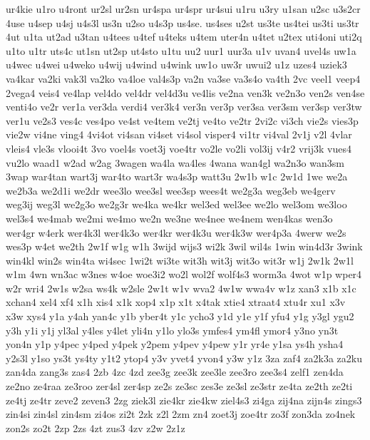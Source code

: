 {ur4kie
u1ro
u4ront
ur2sl
ur2sn
ur4spa
ur4spr
ur4sui
u1ru
u3ry
u1san
u2sc
u3s2cr
4use
u4sep
u4sj
u4s3l
us3n
u2so
u4s3p
us4se.
us4ses
u2st
us3te
us4tei
us3ti
us3tr
4ut
u1ta
ut2ad
u3tan
u4tees
u4tef
u4teks
u4tem
uter4n
u4tet
u2tex
uti4oni
uti2q
u1to
u1tr
uts4c
ut1sn
ut2sp
ut4sto
u1tu
uu2
uur1
uur3a
u1v
uvan4
uvel4s
uw1a
u4wec
u4wei
u4weko
u4wij
u4wind
u4wink
uw1o
uw3r
uwui2
u1z
uzes4
uziek3
va4kar
va2ki
vak3l
va2ko
va4loe
val4s3p
va2n
va3se
va3s4o
va4th
2vc
veel1
veep4
2vega4
veis4
ve4lap
vel4do
vel4dr
vel4d3u
ve4lis
ve2na
ven3k
ve2n3o
ven2s
ven4se
venti4o
ve2r
ver1a
ver3da
verdi4
ver3k4
ver3n
ver3p
ver3sa
ver3sm
ver3sp
ver3tw
ver1u
ve2s3
ves4c
ves4po
ve4st
ve4tem
ve2tj
ve4to
ve2tr
2vi2c
vi3ch
vie2s
vies3p
vie2w
vi4ne
ving4
4vi4ot
vi4san
vi4set
vi4sol
visper4
vi1tr
vi4val
2v1j
v2l
4vlar
vleis4
vle3s
vlooi4t
3vo
voel4s
voet3j
voe4tr
vo2le
vo2li
vol3ij
v4r2
vrij3k
vues4
vu2lo
waad1
w2ad
w2ag
3wagen
wa4la
wa4les
4wana
wan4gl
wa2n3o
wan3sm
3wap
war4tan
wart3j
war4to
wart3r
wa4s3p
watt3u
2w1b
w1c
2w1d
1we
we2a
we2b3a
we2d1i
we2dr
wee3lo
wee3sl
wee3sp
wees4t
we2g3a
weg3eb
we4gerv
weg3ij
weg3l
we2g3o
we2g3r
we4ka
we4kr
wel3ed
wel3ee
we2lo
wel3om
we3loo
wel3s4
we4mab
we2mi
we4mo
we2n
we3ne
we4nee
we4nem
wen4kas
wen3o
wer4gr
w4erk
wer4k3l
wer4k3o
wer4kr
wer4k3u
wer4k3w
wer4p3a
4werw
we2s
wes3p
w4et
we2th
2w1f
w1g
w1h
3wijd
wijs3
wi2k
3wil
wil4s
1win
win4d3r
3wink
win4kl
win2s
win4ta
wi4sec
1wi2t
wi3te
wit3h
wit3j
wit3o
wit3r
w1j
2w1k
2w1l
w1m
4wn
wn3ac
w3nes
w4oe
woe3i2
wo2l
wol2f
wolf4s3
worm3a
4wot
w1p
wper4
w2r
wri4
2w1s
w2sa
ws4k
w2sle
2w1t
w1v
wva2
4w1w
wwa4v
w1z
xan3
x1b
x1c
xchan4
xel4
xf4
x1h
xis4
x1k
xop4
x1p
x1t
x4tak
xtie4
xtraat4
xtu4r
xu1
x3v
x3w
xys4
y1a
y4ah
yan4c
y1b
yber4t
y1c
ycho3
y1d
y1e
y1f
yfu4
y1g
y3gl
ygu2
y3h
y1i
y1j
yl3al
y4les
y4let
yli4n
y1lo
ylo3s
ymfes4
ym4fl
ymor4
y3no
yn3t
yon4n
y1p
y4pec
y4ped
y4pek
y2pem
y4pev
y4pew
y1r
yr4e
y1sa
ys4h
ysha4
y2s3l
y1so
ys3t
ys4ty
y1t2
ytop4
y3v
yvet4
yvon4
y3w
y1z
3za
zaf4
za2k3a
za2ku
zan4da
zang3s
zas4
2zb
4zc
4zd
zee3g
zee3k
zee3le
zee3ro
zee3s4
zelf1
zen4da
ze2no
ze4raa
ze3roo
zer4sl
zer4sp
ze2s
ze3sc
zes3e
ze3sl
ze3str
ze4ta
ze2th
ze2ti
ze4tj
ze4tr
zeve2
zeven3
2zg
ziek3l
zie4kr
zie4kw
ziel4s3
zi4ga
zij4na
zijn4s
zings3
zin4si
zin4sl
zin4sm
zi4os
zi2t
2zk
z2l
2zm
zn4
zoet3j
zoe4tr
zo3f
zon3da
zo4nek
zon2s
zo2t
2zp
2zs
4zt
zus3
4zv
z2w
2z1z
}
